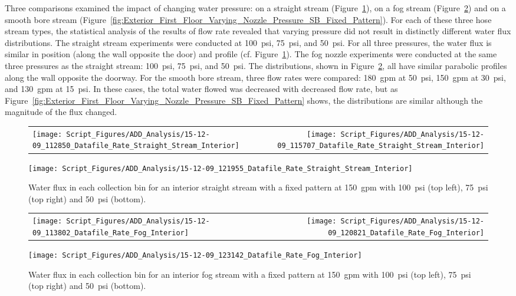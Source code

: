 \documentclass[12pt,oneside]{book}
\begin{document}
Three comparisons examined the impact of changing water pressure: on a straight stream (Figure~\ref{fig:Interior_Varying_Nozzle_Pressure_SS_Fixed_Pattern}), on a fog stream (Figure~\ref{fig:Interior_Varying_Nozzle_Pressure_Fog_Fixed_Pattern}) and on a smooth bore stream (Figure~\ref{fig:Exterior_First_Floor_Varying_Nozzle_Pressure_SB_Fixed_Pattern}). For each of these three hose stream types, the statistical analysis of the results of flow rate revealed that varying pressure did not result in distinctly different water flux distributions. The straight stream experiments were conducted at 100~psi, 75~psi, and 50~psi. For all three pressures, the water flux is similar in position (along the wall opposite the door) and profile (cf. Figure~\ref{fig:Interior_Varying_Nozzle_Pressure_SS_Fixed_Pattern}). The fog nozzle experiments were conducted at the same three pressures as the straight stream: 100~psi, 75~psi, and 50~psi. The distributions, shown in Figure~\ref{fig:Interior_Varying_Nozzle_Pressure_Fog_Fixed_Pattern}, all have similar parabolic profiles along the wall opposite the doorway. For the smooth bore stream, three flow rates were compared: 180~gpm at 50~psi, 150~gpm at 30~psi, and 130~gpm at 15~psi. In these cases, the total water flowed was decreased with decreased flow rate, but as Figure~\ref{fig:Exterior_First_Floor_Varying_Nozzle_Pressure_SB_Fixed_Pattern} shows, the distributions are similar although the magnitude of the flux changed.

\begin{figure}[ht]
\begin{tabular*}{\textwidth}{lr}
\texttt{[image: Script\_Figures/ADD\_Analysis/15-12-09\_112850\_Datafile\_Rate\_Straight\_Stream\_Interior]} &
\texttt{[image: Script\_Figures/ADD\_Analysis/15-12-09\_115707\_Datafile\_Rate\_Straight\_Stream\_Interior]} \\
\end{tabular*}
\centering
\texttt{[image: Script\_Figures/ADD\_Analysis/15-12-09\_121955\_Datafile\_Rate\_Straight\_Stream\_Interior]}
\caption[Water Flux Varying Pressure with Straight Stream]{Water flux in each collection bin for an interior straight stream with a fixed pattern at 150~gpm with 100~psi (top left), 75~psi (top right) and 50~psi (bottom).}
\label{fig:Interior_Varying_Nozzle_Pressure_SS_Fixed_Pattern}
\end{figure}

\begin{figure}[ht]
\begin{tabular*}{\textwidth}{lr}
\texttt{[image: Script\_Figures/ADD\_Analysis/15-12-09\_113802\_Datafile\_Rate\_Fog\_Interior]} &
\texttt{[image: Script\_Figures/ADD\_Analysis/15-12-09\_120821\_Datafile\_Rate\_Fog\_Interior]} \\
\end{tabular*}
\centering
\texttt{[image: Script\_Figures/ADD\_Analysis/15-12-09\_123142\_Datafile\_Rate\_Fog\_Interior]}
\caption[Water Flux Varying Pressure with Fog Stream]{Water flux in each collection bin for an interior fog stream with a fixed pattern at 150~gpm with 100~psi (top left), 75~psi (top right) and 50~psi (bottom).}
\label{fig:Interior_Varying_Nozzle_Pressure_Fog_Fixed_Pattern}
\end{figure}
\end{document}
